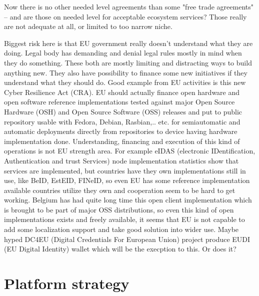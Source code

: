 Now there is no other needed level agreements than some "free trade
agreements" -- and are those on needed level for acceptable ecosystem
services? Those really are not adequate at all, or limited to too narrow
niche.

Biggest risk here is that EU government really doesn't understand what they
are doing. Legal body has demanding and denial legal rules mostly in mind when
they do something. These both are mostly limiting and distracting ways to
build anything new. They also have possibility to finance some new initiatives
if they understand what they should do. Good example from EU activities is
this new Cyber Resilience Act (CRA)\cite{EU_CRA}. EU should actually finance
open hardware and open software reference implementations tested against major
Open Source Hardware (OSH) and Open Source Software (OSS) releases and put to
public repository usable with Fedora, Debian, Rasbian,.. etc. for
semiautomatic and automatic deployments directly from repositories to device
having hardware implementation\cite{ISO_IEC_19790} done. Understanding,
financing and execution of this kind of operations is not EU strength area.
For example eIDAS (electronic IDentification, Authentication and trust
Services) node implementation statistics \cite{eIDASnode} show that services
are implemented, but countries have they own implementations still in use,
like BeID, EstEID, FINeID, so even EU has some reference implementation
available countries utilize they own and cooperation seem to be hard to get
working. Belgium has had quite long time this open client implementation which
is brought to be part of major OSS distributions, so even this kind of open
implementations exists and freely available, it seems that EU is not capable
to add some localization support and take good solution into wider use.
Maybe hyped DC4EU (Digital Credentials For European Union) project\cite{DC4EU}
produce EUDI (EU Digital Identity) wallet\cite{EUDIW} which will be the
execption to this. Or does it? 

\section{Platform strategy}
\label{platform_strategy}

